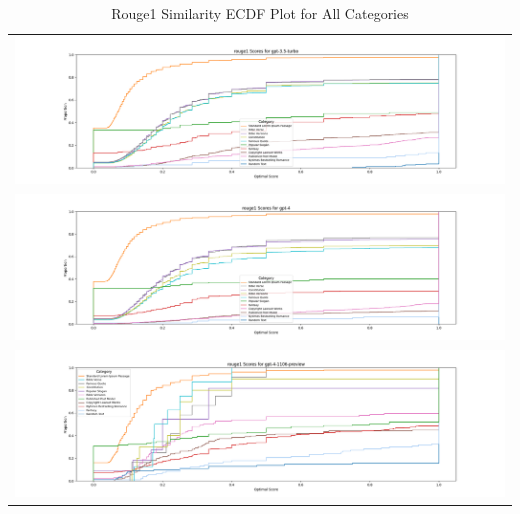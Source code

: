 \documentclass{article}
\begin{document}
\begin{table}[ht] 
\centering 
\begin{tabular}{c} 
\includegraphics[width=1.0\textwidth]{plots/rouge1-ecdf-plot-gpt-3.5-turbo.png}  \\  
\includegraphics[width=1.0\textwidth]{plots/rouge1-ecdf-plot-gpt-4.png}  \\ 
\includegraphics[width=1.0\textwidth]{plots/rouge1-ecdf-plot-gpt-4-1106-preview.png}  \\ 
\end{tabular} 
\caption{Rouge1 Similarity ECDF Plot for All Categories} 
\label{tab:images} 
\end{table}
\end{document}
